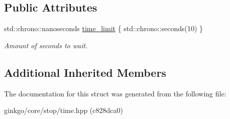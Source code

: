 \subsection*{Public Attributes}
\begin{DoxyCompactItemize}
\item 
\mbox{\label{structgko_1_1stop_1_1Time_1_1parameters__type_aee1d09b9ec4e73561e46e94888cf885a}} 
std\+::chrono\+::nanoseconds \hyperlink{structgko_1_1stop_1_1Time_1_1parameters__type_aee1d09b9ec4e73561e46e94888cf885a}{time\+\_\+limit} \{ std\+::chrono\+::seconds(10) \}
\begin{DoxyCompactList}\small\item\em Amount of seconds to wait. \end{DoxyCompactList}\end{DoxyCompactItemize}
\subsection*{Additional Inherited Members}


The documentation for this struct was generated from the following file\+:\begin{DoxyCompactItemize}
\item 
ginkgo/core/stop/time.\+hpp (c828dca0)\end{DoxyCompactItemize}
